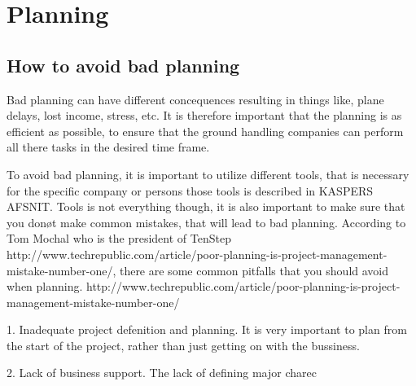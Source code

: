 \chapter{Planning}
\section{How to avoid bad planning}

Bad planning can have different concequences resulting in things like, plane delays, lost income, stress, etc. It is therefore important that the planning is as efficient as possible, to ensure that the ground handling companies can perform all there tasks in the desired time frame.

To avoid bad planning, it is important to utilize different tools, that is necessary for the specific company or persons those tools is described in KASPERS AFSNIT. Tools is not everything though, it is also important to make sure that you donøt make common mistakes, that will lead to bad planning. According to Tom Mochal who is the president of TenStep http://www.techrepublic.com/article/poor-planning-is-project-management-mistake-number-one/, there are some common pitfalls that you should avoid when planning. http://www.techrepublic.com/article/poor-planning-is-project-management-mistake-number-one/

1. Inadequate project defenition and planning. It is very important to plan from the start of the project, rather than just getting on with the bussiness.

2. Lack of business support. The lack of defining major charec